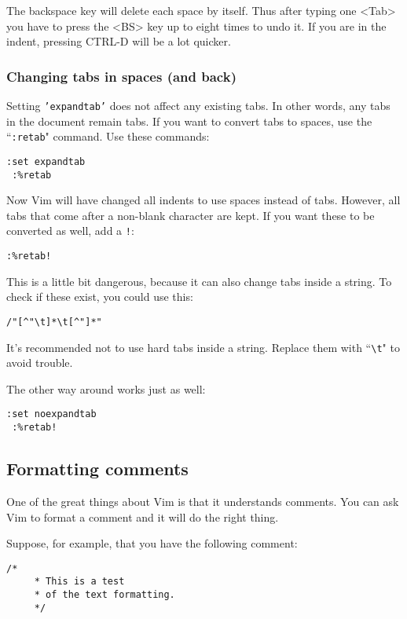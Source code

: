 The backspace key will delete each space by itself.
Thus after typing one <Tab> you have to press the <BS> key up to eight times to undo it.
If you are in the indent, pressing CTRL-D will be a lot quicker.

\subsubsection{Changing tabs in spaces (and back)}
Setting \texttt{'expandtab'} does not affect any existing tabs.
In other words, any tabs in the document remain tabs.
If you want to convert tabs to spaces, use the ``\texttt{:retab}" command.
Use these commands:

\begin{Verbatim}[samepage=true]
 :set expandtab
 :%retab
\end{Verbatim}

Now Vim will have changed all indents to use spaces instead of tabs.
However, all tabs that come after a non-blank character are kept.
If you want these to be converted as well, add a \texttt{!}:

\begin{Verbatim}[samepage=true]
 :%retab!
\end{Verbatim}

This is a little bit dangerous, because it can also change tabs inside a string.
To check if these exist, you could use this:

\begin{Verbatim}[samepage=true]
 /"[^"\t]*\t[^"]*"
\end{Verbatim}

It's recommended not to use hard tabs inside a string.
Replace them with ``\texttt{\textbackslash{}t}" to avoid trouble.

The other way around works just as well:

\begin{Verbatim}[samepage=true]
 :set noexpandtab
 :%retab!
\end{Verbatim}
\subsection{Formatting comments}
One of the great things about Vim is that it understands comments.
You can ask Vim to format a comment and it will do the right thing.

Suppose, for example, that you have the following comment:

\begin{Verbatim}[samepage=true]
    /*
     * This is a test
     * of the text formatting.
     */
\end{Verbatim}

